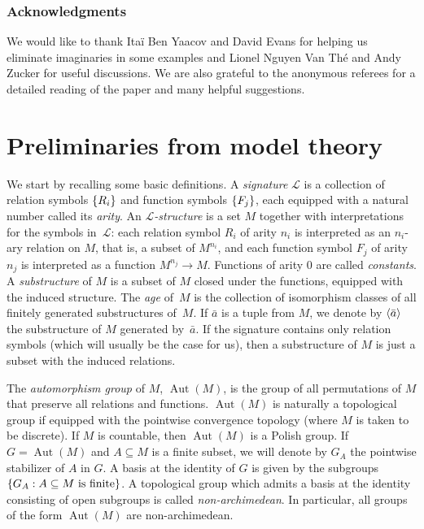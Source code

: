 \documentclass[11pt]{article}
\let\mathcal\mathscr
\let\sub\subseteq
\theoremstyle{plain}
\theoremstyle{definition}
\newcommand{\cL}{\mathcal{L}}
\DeclareMathOperator{\Aut}{Aut}
\DeclarePairedDelimiter\gen{\langle}{\rangle}
\DeclarePairedDelimiter\set{\{}{\}}
\begin{document}
\subsubsection*{Acknowledgments} We would like to thank Itaï Ben Yaacov and David Evans for helping us eliminate imaginaries in some examples and Lionel Nguyen Van Thé and Andy Zucker for useful discussions. We are also grateful to the anonymous referees for a detailed reading of the paper and many helpful suggestions.


\section{Preliminaries from model theory}
\label{sec:prel-from-model}

We start by recalling some basic definitions. A \emph{signature} $\cL$ is a collection of relation symbols $\set{R_i}$ and function symbols $\set{F_j}$, each equipped with a natural number called its \emph{arity}. An \emph{$\cL$-structure} is a set $M$ together with interpretations for the symbols in~$\cL$: each relation symbol $R_i$ of arity $n_i$ is interpreted as an $n_i$-ary relation on $M$, that is, a subset of $M^{n_i}$, and each function symbol $F_j$ of arity $n_j$ is interpreted as a function $M^{n_j} \to M$. Functions of arity $0$ are called \emph{constants}. A \emph{substructure} of $M$ is a subset of $M$ closed under the functions, equipped with the induced structure. The \emph{age} of~$M$ is the collection of isomorphism classes of all finitely generated substructures of~$M$. If $\bar a$ is a tuple from $M$, we denote by $\gen{\bar a}$ the substructure of $M$ generated by~$\bar a$. If the signature contains only relation symbols (which will usually be the case for us), then a substructure of $M$ is just a subset with the induced relations.

The \emph{automorphism group} of $M$, $\Aut(M)$, is the group of all permutations of $M$ that preserve all relations and functions. $\Aut(M)$ is naturally a topological group if equipped with the pointwise convergence topology (where $M$ is taken to be discrete). If $M$ is countable, then $\Aut(M)$ is a Polish group. If $G = \Aut(M)$ and $A \sub M$ is a finite subset, we will denote by $G_{A}$ the pointwise stabilizer of $A$ in $G$. A basis at the identity of $G$ is given by the subgroups $\set{G_A : A \sub M \text{ is finite}}$. A topological group which admits a basis at the identity consisting of open subgroups is called \emph{non-archimedean}. In particular, all groups of the form $\Aut(M)$ are non-archimedean.
\end{document}
